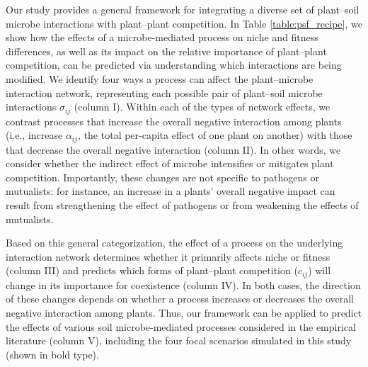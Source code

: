 Our study provides a general framework for integrating a diverse set of plant--soil microbe interactions with plant--plant competition. In Table \ref{table:psf_recipe}, we show how the effects of a microbe-mediated process on niche and fitness differences, as well as its impact on the relative importance of plant--plant competition, can be predicted via understanding which interactions are being modified.
We identify four ways a process can affect the plant--microbe interaction network, representing each possible pair of plant--soil microbe interactions $\sigma_{ij}$ (column I). Within each of the types of network effects, we contrast processes that increase the overall negative interaction among plants (i.e., increase $\alpha_{ij}$, the total per-capita effect of one plant on another) with those that decrease the overall negative interaction (column II). In other words, we consider whether the indirect effect of microbe intensifies or mitigates plant competition. Importantly, these changes are not specific to pathogens or mutualists: for instance,  an increase in a plants' overall negative impact can result from strengthening the effect of pathogens or from weakening the effects of mutualists.
\par


Based on this general categorization, the effect of a process on the underlying interaction network determines whether it primarily affects niche or fitness (column III) and predicts which forms of plant--plant competition ($c_{ij}$) will change in its importance for coexistence (column IV). In both cases, the direction of these changes depends on whether a process increases or decreases the overall negative interaction among plants. Thus, our framework can be applied to predict the effects of various soil microbe-mediated processes considered in the empirical literature (column V), including the four focal scenarios simulated in this study (shown in bold type).
\par



